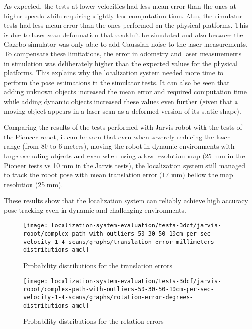 As expected, the tests at lower velocities had less mean error than the ones at higher speeds while requiring slightly less computation time. Also, the simulator tests had less mean error than the ones performed on the physical platforms. This is due to laser scan deformation that couldn't be simulated and also because the Gazebo simulator was only able to add Gaussian noise to the laser measurements. To compensate these limitations, the error in odometry and laser measurements in simulation was deliberately higher than the expected values for the physical platforms. This explains why the localization system needed more time to perform the pose estimations in the simulator tests. It can also be seen that adding unknown objects increased the mean error and required computation time while adding dynamic objects increased these values even further (given that a moving object appears in a laser scan as a deformed version of its static shape).

Comparing the results of the tests performed with Jarvis robot  with the tests of the Pioneer robot, it can be seen that even when severely reducing the laser range (from 80 to 6 meters), moving the robot in dynamic environments with large occluding objects and even when using a low resolution map (25 mm in the Pioneer tests vs 10 mm in the Jarvis tests), the localization system still managed to track the robot pose with mean translation error (17 mm) bellow the map resolution (25 mm).

These results show that the localization system can reliably achieve high accuracy pose tracking even in dynamic and challenging environments.

\begin{figure}[H]
	\centering
	\begin{minipage}[H]{0.47\textwidth}
		\centering
		\texttt{[image: localization-system-evaluation/tests-3dof/jarvis-robot/complex-path-with-outliers-50-30-50-10cm-per-sec-velocity-1-4-scans/graphs/translation-error-millimeters-distributions-amcl]}
		\caption{Probability distributions for the  translation errors}
		\label{fig:localization-system-evaluation_complex-path-with-outliers-50-30-50-10cm-per-sec-velocity-1-4-translation-error-amcl}
	\end{minipage}\hfill
	\begin{minipage}[H]{0.47\textwidth}
		\centering
		\texttt{[image: localization-system-evaluation/tests-3dof/jarvis-robot/complex-path-with-outliers-50-30-50-10cm-per-sec-velocity-1-4-scans/graphs/rotation-error-degrees-distributions-amcl]}
		\caption{Probability distributions for the  rotation errors}
		\label{fig:localization-system-evaluation_complex-path-with-outliers-50-30-50-10cm-per-sec-velocity-1-4-rotation-error-amcl}
	\end{minipage}
\end{figure}

